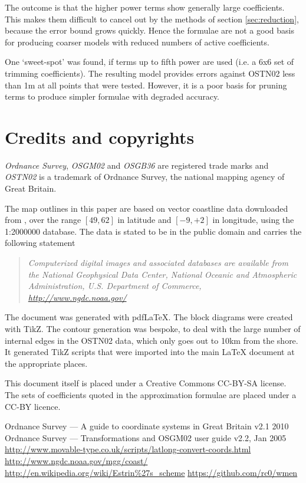\documentclass[10pt,a4paper]{article}
\begin{document}
The outcome is that the higher power terms show generally large coefficients.
This makes them difficult to cancel out by the methods of section
\ref{sec:reduction}, because the error bound grows quickly.  Hence the formulae
are not a good basis for producing coarser models with reduced numbers of
active coefficients.

One `sweet-spot' was found, if terms up to fifth power are used (i.e. a 6x6 set
of trimming coefficients).  The resulting model provides errors against OSTN02
less than 1m at all points that were tested.  However, it is a poor basis for
pruning terms to produce simpler formulae with degraded accuracy.

\section {Credits and copyrights}

\textsl{Ordnance Survey}, \textsl{OSGM02} and \textsl{OSGB36} are registered
trade marks and \textsl{OSTN02} is a trademark of Ordnance Survey, the national
mapping agency of Great Britain.

The map outlines in this paper are based on vector coastline data downloaded
from \cite{ngdc}, over the range $[49,62]$ in latitude and $[-9,+2]$ in
longitude, using the 1:2000000 database.  The data is stated to be in the
public domain and carries the following statement
\begin{quote}
\textsl{
Computerized digital images and associated databases are available from the
National Geophysical Data Center, National Oceanic and Atmospheric
Administration, U.S. Department of Commerce, \url{http://www.ngdc.noaa.gov/}}
\end{quote}

The document was generated with pdf\LaTeX.  The block diagrams were created
with TikZ.  The contour generation was bespoke, to deal with the large number
of internal edges in the OSTN02 data, which only goes out to 10km from the
shore.  It generated TikZ scripts that were imported into the main \LaTeX{}
document at the appropriate places.

This document itself is placed under a Creative Commons CC-BY-SA license.  The
sets of coefficients quoted in the approximation formulae are placed under a
CC-BY licence.

\begin{thebibliography}{99}
   Ordnance Survey --- A guide to coordinate systems in Great Britain v2.1 2010
   Ordnance Survey --- Transformations and OSGM02 user guide v2.2, Jan 2005
   \url{http://www.movable-type.co.uk/scripts/latlong-convert-coords.html}
   \url{http://www.ngdc.noaa.gov/mgg/coast/}
   \url{http://en.wikipedia.org/wiki/Estrin%27s_scheme}
   \url{https://github.com/rc0/wmen}
\end{thebibliography}
\end{document}
